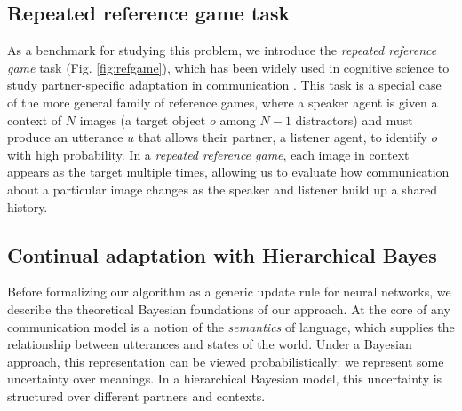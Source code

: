 \subsection{Repeated reference game task}
As a benchmark for studying this problem, we introduce the \emph{repeated reference game} task (Fig. \ref{fig:refgame}), which has been widely used in cognitive science to study partner-specific adaptation in communication \cite{KraussWeinheimer64_ReferencePhrases,ClarkWilkesGibbs86_ReferringCollaborative,WilkesGibbsClark92_CoordinatingBeliefs}.
This task is a special case of the more general family of reference games, where a speaker agent is given a context of $N$ images (a target object $o$ among $N-1$ distractors) and must produce an utterance $u$ that allows their partner, a listener agent, to identify $o$ with high probability. 
In a \emph{repeated reference game}, each image in context appears as the target multiple times, allowing us to evaluate how communication about a particular image changes as the speaker and listener build up a shared history. 

\subsection{Continual adaptation with Hierarchical Bayes}
Before formalizing our algorithm as a generic update rule for neural networks, we describe the theoretical Bayesian foundations of our approach.
At the core of any communication model is a notion of the \emph{semantics} of language, which supplies the relationship between utterances and states of the world. 
Under a Bayesian approach, this representation can be viewed probabilistically: we represent some uncertainty over meanings.
In a hierarchical Bayesian model, this uncertainty is structured over different partners and contexts.

